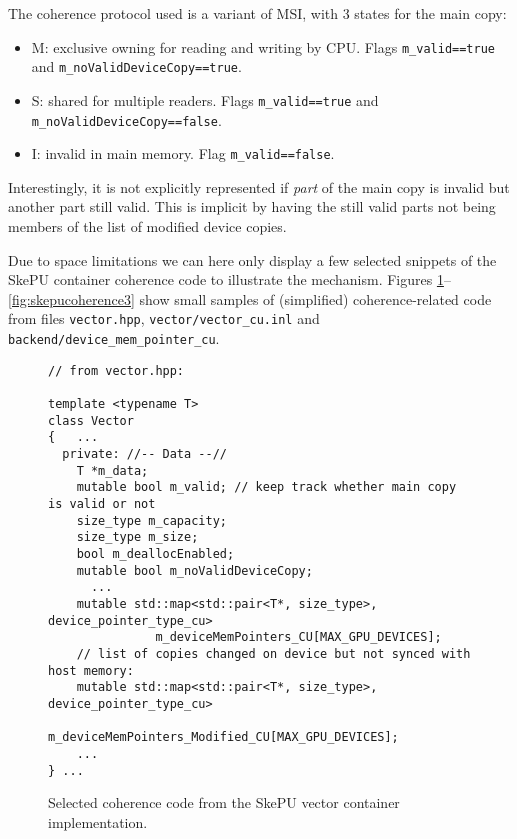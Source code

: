 The coherence protocol used is a variant of MSI, with 3 states for the main copy:
\begin{itemize}
\item M: exclusive owning for reading and writing by CPU.
         Flags \verb+m_valid==true+ and \verb+m_noValidDeviceCopy==true+.
\item S: shared for multiple readers.  
         Flags \verb+m_valid==true+ and 
               \verb+m_noValidDeviceCopy==false+.
\item I: invalid in main memory.  Flag \verb+m_valid==false+.
\end{itemize}

Interestingly, it is not explicitly represented if \emph{part} of 
the main copy is invalid but another part still valid. 
This is implicit by having the still valid parts not
being members of the list of modified device copies.


Due to space limitations we can here only display a few selected 
snippets of the SkePU container coherence code to illustrate the mechanism.
Figures \ref{fig:skepucoherence1}--\ref{fig:skepucoherence3} show small
samples of (simplified) coherence-related
code from files \texttt{vector.hpp}, %
 \texttt{vector/vector\_cu.inl} and \texttt{backend/device\_mem\_pointer\_cu}.

\begin{figure}
\begin{small}
\begin{verbatim}
// from vector.hpp:

template <typename T>
class Vector
{   ...
  private: //-- Data --//
    T *m_data;
    mutable bool m_valid; // keep track whether main copy is valid or not
    size_type m_capacity;
    size_type m_size;
    bool m_deallocEnabled;
    mutable bool m_noValidDeviceCopy;
      ...
    mutable std::map<std::pair<T*, size_type>, device_pointer_type_cu>
               m_deviceMemPointers_CU[MAX_GPU_DEVICES];
    // list of copies changed on device but not synced with host memory:
    mutable std::map<std::pair<T*, size_type>, device_pointer_type_cu>
                m_deviceMemPointers_Modified_CU[MAX_GPU_DEVICES];
    ...
} ...
\end{verbatim}
\end{small}

\vspace{-3mm}
\caption{\label{fig:skepucoherence1}Selected coherence code from the SkePU vector container implementation.}
\end{figure}
  
